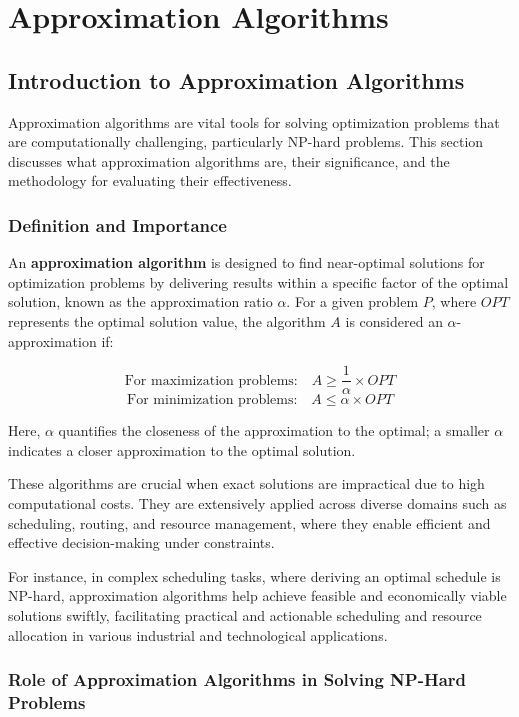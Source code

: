 \documentclass[12pt]{book} %
\begin{document}
\chapter{Approximation Algorithms}

\section{Introduction to Approximation Algorithms}

Approximation algorithms are vital tools for solving optimization problems that are computationally challenging, particularly NP-hard problems. This section discusses what approximation algorithms are, their significance, and the methodology for evaluating their effectiveness.

\subsection{Definition and Importance}

An \textbf{approximation algorithm} is designed to find near-optimal solutions for optimization problems by delivering results within a specific factor of the optimal solution, known as the approximation ratio \(\alpha\). For a given problem \(P\), where \(OPT\) represents the optimal solution value, the algorithm \(A\) is considered an \(\alpha\)-approximation if:

\[
\text{For maximization problems:} \quad A \geq \frac{1}{\alpha} \times OPT
\]
\[
\text{For minimization problems:} \quad A \leq \alpha \times OPT
\]

Here, \(\alpha\) quantifies the closeness of the approximation to the optimal; a smaller \(\alpha\) indicates a closer approximation to the optimal solution.

These algorithms are crucial when exact solutions are impractical due to high computational costs. They are extensively applied across diverse domains such as scheduling, routing, and resource management, where they enable efficient and effective decision-making under constraints.

For instance, in complex scheduling tasks, where deriving an optimal schedule is NP-hard, approximation algorithms help achieve feasible and economically viable solutions swiftly, facilitating practical and actionable scheduling and resource allocation in various industrial and technological applications.


\subsection{Role of Approximation Algorithms in Solving NP-Hard Problems}
\end{document}
